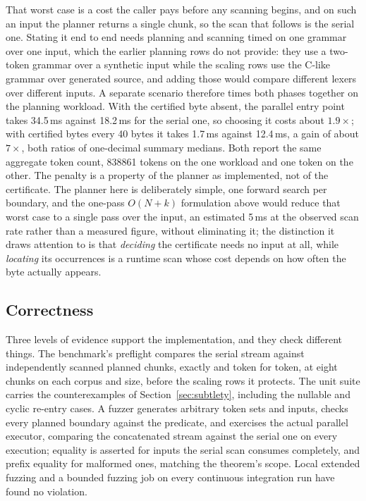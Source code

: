 \documentclass[11pt,a4paper]{article}
\theoremstyle{definition}
\theoremstyle{plain}
\begin{document}
That worst case is a cost the caller pays before any scanning begins, and on such an input the planner returns a single
chunk, so the scan that follows is the serial one. Stating it end to end needs planning and scanning timed on one
grammar over one input, which the earlier planning rows do not provide: they use a two-token grammar over a synthetic
input while the scaling rows use the C-like grammar over generated source, and adding those would compare different
lexers over different inputs. A separate scenario therefore times both phases together on the planning workload. With
the certified byte absent, the parallel entry point takes 34.5\,ms against 18.2\,ms for the serial one, so choosing it
costs about $1.9\times$; with certified bytes every 40 bytes it takes 1.7\,ms against 12.4\,ms, a gain of about
$7\times$, both ratios of one-decimal summary medians. Both report the same aggregate token count, 838861 tokens on the
one workload and one token on the other. The penalty is a property of the planner as implemented, not of the
certificate. The planner here is deliberately simple, one forward search per boundary, and the one-pass $O(N + k)$
formulation above would reduce that worst case to a single pass over the input, an estimated 5\,ms at the observed scan
rate rather than a measured figure, without eliminating it; the distinction it draws attention to is that
\emph{deciding} the certificate needs no input at all, while \emph{locating} its occurrences is a runtime scan whose
cost depends on how often the byte actually appears.

\subsection{Correctness}

Three levels of evidence support the implementation, and they check different things. The benchmark's preflight
compares the serial stream against independently scanned planned chunks, exactly and token for token, at eight chunks
on each corpus and size, before the scaling rows it protects. The unit suite carries the counterexamples of
Section~\ref{sec:subtlety}, including the nullable and cyclic re-entry cases. A fuzzer generates arbitrary token sets
and inputs, checks every planned boundary against the predicate, and exercises the actual parallel executor, comparing
the concatenated stream against the serial one on every execution; equality is asserted for inputs the serial scan
consumes completely, and prefix equality for malformed ones, matching the theorem's scope. Local extended fuzzing and
a bounded fuzzing job on every continuous integration run have found no violation.
\end{document}
